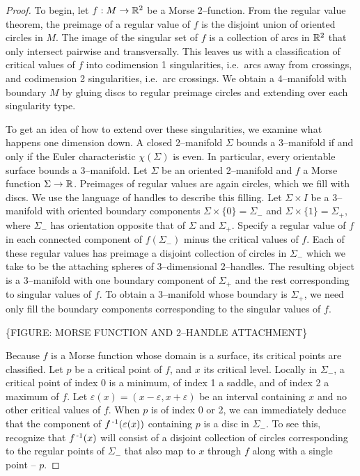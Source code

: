 \begin{proof}

To begin, let $f:M\to\mathbb{R}^2$ be a Morse 2--function.	
From the regular value theorem, the preimage of a regular value of $f$ is the disjoint union of oriented circles in $M$.	
The image of the singular set of $f$ is a collection of arcs in $\mathbb{R}^2$ that only intersect pairwise and transversally.
This leaves us with a classification of critical values of $f$ into codimension 1 singularities, i.e.\ arcs away from crossings, and codimension 2 singularities, i.e.\ arc crossings.
We obtain a 4--manifold with boundary $M$ by gluing discs to regular preimage circles and extending over each singularity type.
	
To get an idea of how to extend over these singularities, we examine what happens one dimension down.
A closed 2--manifold $\Sigma$ bounds a 3--manifold if and only if the Euler characteristic $\chi(\Sigma)$ is even.
In particular, every orientable surface bounds a 3--manifold.
Let $\Sigma$ be an oriented 2--manifold and $f$ a Morse function $\Sigma\to\mathbb{R}$.
Preimages of regular values are again circles, which we fill with discs.
We use the language of handles to describe this filling.
Let $\Sigma\times I$ be a 3--manifold with oriented boundary components $\Sigma\times\{0\}=\Sigma_-$ and $\Sigma\times\{1\}=\Sigma_+$, where $\Sigma_-$ has orientation opposite that of $\Sigma$ and $\Sigma_+$.
Specify a regular value of $f$ in each connected component of $f(\Sigma_-)$ minus the critical values of $f$.
Each of these regular values has preimage a disjoint collection of circles in $\Sigma_-$ which we take to be the attaching spheres of 3--dimensional 2--handles. 
The resulting object is a 3--manifold with one boundary component of $\Sigma_+$ and the rest corresponding to singular values of $f$.
To obtain a 3--manifold whose boundary is $\Sigma_+$, we need only fill the boundary components corresponding to the singular values of $f$.

\{FIGURE: MORSE FUNCTION AND 2--HANDLE ATTACHMENT\}

Because $f$ is a Morse function whose domain is a surface, its critical points are classified.
Let $p$ be a critical point of $f$, and $x$ its critical level.
Locally in $\Sigma_-$, a critical point of index 0 is a minimum, of index 1 a saddle, and of index 2 a maximum of $f$.
Let $\varepsilon(x)=(x-\varepsilon,x+\varepsilon)$ be an interval containing $x$ and no other critical values of $f$.
When $p$ is of index 0 or 2, we can immediately deduce that the component of $f^{\,\text{-}1}(\varepsilon(x))$ containing $p$ is a disc in $\Sigma_-$.
To see this, recognize that $f^{\,\text{-}1}(x)$ will consist of a disjoint collection of circles corresponding to the regular points of $\Sigma_-$ that also map to $x$ through $f$ along with a single point -- $p$.


\end{proof}
